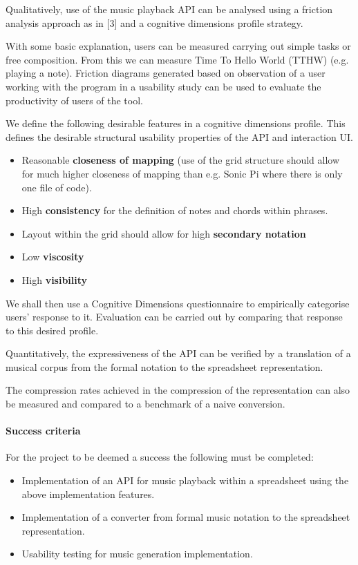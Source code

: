 \documentclass[]{article}
\let\oldparagraph\paragraph
\renewcommand{\paragraph}[1]{\oldparagraph{#1}\mbox{}}
\begin{document}
Qualitatively, use of the music playback API can be analysed using a
friction analysis approach as in {[}3{]} and a cognitive dimensions
profile strategy.

With some basic explanation, users can be measured carrying out simple
tasks or free composition. From this we can measure Time To Hello World
(TTHW) (e.g. playing a note). Friction diagrams generated based on
observation of a user working with the program in a usability study can
be used to evaluate the productivity of users of the tool.

We define the following desirable features in a cognitive dimensions
profile. This defines the desirable structural usability properties of
the API and interaction UI.

\begin{itemize}
\item
  Reasonable \textbf{closeness of mapping} (use of the grid structure
  should allow for much higher closeness of mapping than e.g. Sonic Pi
  where there is only one file of code).
\item
  High \textbf{consistency} for the definition of notes and chords
  within phrases.
\item
  Layout within the grid should allow for high \textbf{secondary
  notation}
\item
  Low \textbf{viscosity}
\item
  High \textbf{visibility}
\end{itemize}

We shall then use a Cognitive Dimensions questionnaire to empirically
categorise users' response to it. Evaluation can be carried out by
comparing that response to this desired profile.

Quantitatively, the expressiveness of the API can be verified by a
translation of a musical corpus from the formal notation to the
spreadsheet representation.

The compression rates achieved in the compression of the representation
can also be measured and compared to a benchmark of a naive conversion.

\paragraph{Success criteria}\label{header-n67}

For the project to be deemed a success the following must be completed:

\begin{itemize}
\item
  Implementation of an API for music playback within a spreadsheet using
  the above implementation features.
\item
  Implementation of a converter from formal music notation to the
  spreadsheet representation.
\item
  Usability testing for music generation implementation.
\end{itemize}
\end{document}
